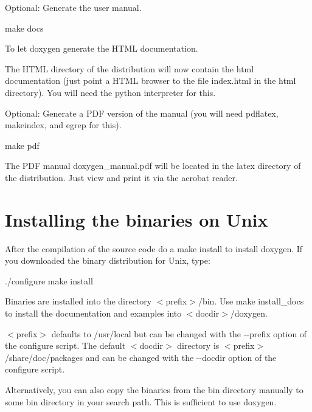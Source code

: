 \begin{DoxyEnumerate}
\item Optional: Generate the user manual.

\begin{DoxyVerb}
    make docs
\end{DoxyVerb}


To let doxygen generate the HTML documentation.

The HTML directory of the distribution will now contain the html documentation (just point a HTML browser to the file {\ttfamily index.html} in the html directory). You will need the {\ttfamily python} interpreter for this.


\item Optional: Generate a PDF version of the manual (you will need {\ttfamily pdflatex}, {\ttfamily makeindex}, and {\ttfamily egrep} for this).

\begin{DoxyVerb}
    make pdf
\end{DoxyVerb}


The PDF manual {\ttfamily doxygen\_\-manual.pdf} will be located in the latex directory of the distribution. Just view and print it via the acrobat reader.


\end{DoxyEnumerate}\hypertarget{install_install_bin_unix}{}\section{Installing the binaries on Unix}\label{install_install_bin_unix}
After the compilation of the source code do a {\ttfamily make install} to install doxygen. If you downloaded the binary distribution for Unix, type:

\begin{DoxyVerb}
    ./configure
    make install
\end{DoxyVerb}


Binaries are installed into the directory {\ttfamily $<$prefix$>$/bin}. Use {\ttfamily make install\_\-docs} to install the documentation and examples into {\ttfamily $<$docdir$>$/doxygen}.

{\ttfamily $<$prefix$>$} defaults to {\ttfamily /usr/local} but can be changed with the {\ttfamily -\/-\/prefix} option of the configure script. The default {\ttfamily $<$docdir$>$} directory is {\ttfamily $<$prefix$>$/share/doc/packages} and can be changed with the {\ttfamily -\/-\/docdir} option of the configure script.

Alternatively, you can also copy the binaries from the {\ttfamily bin} directory manually to some {\ttfamily bin} directory in your search path. This is sufficient to use doxygen.

